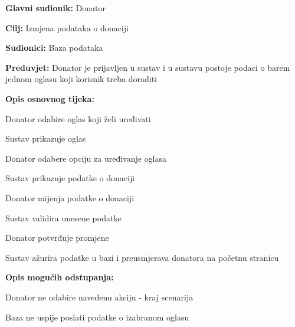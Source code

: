 					\noindent {}
					\begin{packed_item}
	
						\item \textbf{Glavni sudionik: }Donator
						\item  \textbf{Cilj:} Izmjena podataka o donaciji
						\item  \textbf{Sudionici:} Baza podataka
						\item  \textbf{Preduvjet:} Donator je prijavljen u sustav i u sustavu postoje podaci o barem jednom oglasu koji korisnik treba doraditi
						
						\eject
						
						\item  \textbf{Opis osnovnog tijeka:}
						
						\item[] \begin{packed_enum}
							\item Donator odabire oglas koji želi uređivati
							\item Sustav prikazuje oglas
							\item Donator odabere opciju za uređivanje oglasa
							\item Sustav prikazuje podatke o donaciji
							\item Donator mijenja podatke o donaciji
							\item Sustav validira unesene podatke
							\item Donator potvrđuje promjene
							\item Sustav ažurira podatke u bazi i preusmjerava donatora na početnu stranicu
						\end{packed_enum}

						\item  \textbf{Opis mogućih odstupanja:}

						\item[] \begin{packed_item}
							\item[1.a] Donator ne odabire navedenu akciju - kraj scenarija
							\item[2.a] Baza ne uspije poslati podatke o izabranom oglasu
							\item[] \begin{packed_enum}
								

\end{packed_enum}
\end{packed_item}
\end{packed_item}

